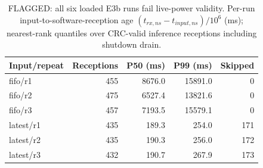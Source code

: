 \begin{table}[H]
\centering\small
\caption{FLAGGED: all six loaded E3b runs fail live-power validity. Per-run input-to-software-reception age $(t_{rx,ns}-t_{input,ns})/10^6$ (ms); nearest-rank quantiles over CRC-valid inference receptions including shutdown drain.}\label{tab:e3b}
\begin{tabular}{lrrrr}
\toprule
Input/repeat & Receptions & P50 (ms) & P99 (ms) & Skipped \\
\midrule
fifo/r1 & 455 & 8676.0 & 15891.0 & 0 \\
fifo/r2 & 475 & 6527.4 & 13821.6 & 0 \\
fifo/r3 & 457 & 7193.5 & 15579.1 & 0 \\
latest/r1 & 435 & 189.3 & 254.0 & 171 \\
latest/r2 & 435 & 190.3 & 256.0 & 172 \\
latest/r3 & 432 & 190.7 & 267.9 & 173 \\
\bottomrule
\end{tabular}
\end{table}
